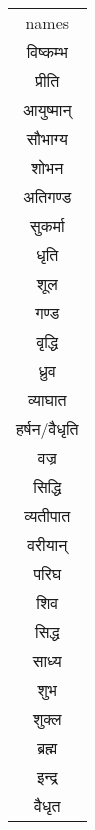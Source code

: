 \begin{table}
\begin{tabular}{c}
names\\
विष्कम्भ\\
प्रीति\\
आयुष्मान्\\
सौभाग्य\\
शोभन\\
अतिगण्ड\\
सुकर्मा\\
धृति\\
शूल\\
गण्ड\\
वृद्धि\\
ध्रुव\\
व्याघात\\
हर्षन/वैधृति\\
वज्र\\
सिद्धि\\
व्यतीपात\\
वरीयान्\\
परिघ\\
शिव\\
सिद्ध\\
साध्य\\
शुभ\\
शुक्ल\\
ब्रह्म\\
इन्द्र\\
वैधृत\\
\end{tabular} 
\end{table}
